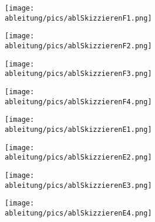 \newpage
\begin{Exercise}[title={\raggedright Skizziere jeweils die Ableitungsfunktion.}, label=ableitungSkizzierenA1]

	\begin{minipage}{\textwidth}
		\begin{minipage}{0.5\textwidth}
			\centering\texttt{[image: \\ableitung/pics/ablSkizzierenF1.png]}

            \vspace{0.1cm}

			\centering\texttt{[image: \\ableitung/pics/ablSkizzierenF2.png]}

            \vspace{0.1cm}

			\centering\texttt{[image: \\ableitung/pics/ablSkizzierenF3.png]}

            \vspace{0.1cm}

			\centering\texttt{[image: \\ableitung/pics/ablSkizzierenF4.png]}
		\end{minipage}%
		\begin{minipage}{0.5\textwidth}
			\centering\texttt{[image: \\ableitung/pics/ablSkizzierenE1.png]}

            \vspace{0.1cm}

			\centering\texttt{[image: \\ableitung/pics/ablSkizzierenE2.png]}

            \vspace{0.1cm}

			\centering\texttt{[image: \\ableitung/pics/ablSkizzierenE3.png]}

            \vspace{0.1cm}

			\centering\texttt{[image: \\ableitung/pics/ablSkizzierenE4.png]}
		\end{minipage}%
	\end{minipage}
\end{Exercise}
